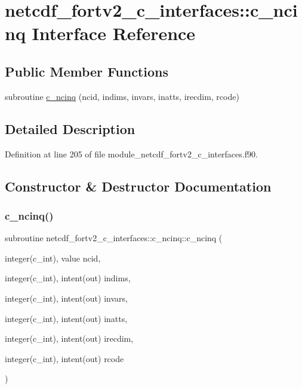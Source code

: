 \hypertarget{interfacenetcdf__fortv2__c__interfaces_1_1c__ncinq}{}\section{netcdf\+\_\+fortv2\+\_\+c\+\_\+interfaces\+:\+:c\+\_\+ncinq Interface Reference}
\label{interfacenetcdf__fortv2__c__interfaces_1_1c__ncinq}
\subsection*{Public Member Functions}
\begin{DoxyCompactItemize}
\item 
subroutine \hyperlink{interfacenetcdf__fortv2__c__interfaces_1_1c__ncinq_a4322dc8f65479daf6ccb9b64a0d69157}{c\+\_\+ncinq} (ncid, indims, invars, inatts, irecdim, rcode)
\end{DoxyCompactItemize}


\subsection{Detailed Description}


Definition at line 205 of file module\+\_\+netcdf\+\_\+fortv2\+\_\+c\+\_\+interfaces.\+f90.



\subsection{Constructor \& Destructor Documentation}
\mbox{\label{interfacenetcdf__fortv2__c__interfaces_1_1c__ncinq_a4322dc8f65479daf6ccb9b64a0d69157}} 
\subsubsection{\texorpdfstring{c\+\_\+ncinq()}{c\_ncinq()}}
{\footnotesize\ttfamily subroutine netcdf\+\_\+fortv2\+\_\+c\+\_\+interfaces\+::c\+\_\+ncinq\+::c\+\_\+ncinq (\begin{DoxyParamCaption}\item[{integer(c\+\_\+int), value}]{ncid,  }\item[{integer(c\+\_\+int), intent(out)}]{indims,  }\item[{integer(c\+\_\+int), intent(out)}]{invars,  }\item[{integer(c\+\_\+int), intent(out)}]{inatts,  }\item[{integer(c\+\_\+int), intent(out)}]{irecdim,  }\item[{integer(c\+\_\+int), intent(out)}]{rcode }\end{DoxyParamCaption})}



